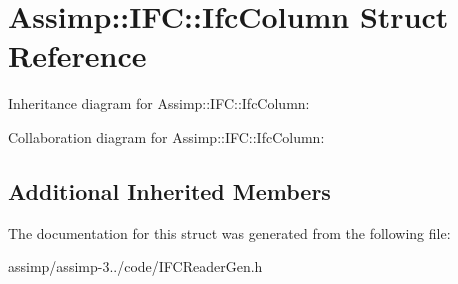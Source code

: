\hypertarget{struct_assimp_1_1_i_f_c_1_1_ifc_column}{\section{Assimp\+:\+:I\+F\+C\+:\+:Ifc\+Column Struct Reference}
\label{struct_assimp_1_1_i_f_c_1_1_ifc_column}
}


Inheritance diagram for Assimp\+:\+:I\+F\+C\+:\+:Ifc\+Column\+:


Collaboration diagram for Assimp\+:\+:I\+F\+C\+:\+:Ifc\+Column\+:
\subsection*{Additional Inherited Members}


The documentation for this struct was generated from the following file\+:\begin{DoxyCompactItemize}
\item 
assimp/assimp-\/3../code/I\+F\+C\+Reader\+Gen.\+h\end{DoxyCompactItemize}
